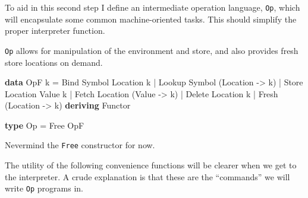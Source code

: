 \documentclass[]{article}
\newenvironment{Shaded}{}{}
\newcommand{\KeywordTok}[1]{\textcolor[rgb]{0.00,0.44,0.13}{\textbf{{#1}}}}
\newcommand{\DataTypeTok}[1]{\textcolor[rgb]{0.56,0.13,0.00}{{#1}}}
\newcommand{\OtherTok}[1]{\textcolor[rgb]{0.00,0.44,0.13}{{#1}}}
\newcommand{\FunctionTok}[1]{\textcolor[rgb]{0.02,0.16,0.49}{{#1}}}
\newcommand{\NormalTok}[1]{{#1}}
\begin{document}
To aid in this second step I define an intermediate operation language,
\texttt{Op}, which will encapsulate some common machine-oriented tasks.
This should simplify the proper interpreter function.

\texttt{Op} allows for manipulation of the environment and store, and
also provides fresh store locations on demand.

\begin{Shaded}
\begin{Highlighting}[]
\KeywordTok{data} \DataTypeTok{OpF} \NormalTok{k}
    \FunctionTok{=} \DataTypeTok{Bind}   \DataTypeTok{Symbol} \DataTypeTok{Location} \NormalTok{k}
    \FunctionTok{|} \DataTypeTok{Lookup} \DataTypeTok{Symbol} \NormalTok{(}\DataTypeTok{Location} \OtherTok{->} \NormalTok{k)}
    \FunctionTok{|} \DataTypeTok{Store}  \DataTypeTok{Location} \DataTypeTok{Value} \NormalTok{k}
    \FunctionTok{|} \DataTypeTok{Fetch}  \DataTypeTok{Location} \NormalTok{(}\DataTypeTok{Value} \OtherTok{->} \NormalTok{k)}
    \FunctionTok{|} \DataTypeTok{Delete} \DataTypeTok{Location} \NormalTok{k}
    \FunctionTok{|} \DataTypeTok{Fresh}  \NormalTok{(}\DataTypeTok{Location} \OtherTok{->} \NormalTok{k)}
    \KeywordTok{deriving} \DataTypeTok{Functor}
\end{Highlighting}
\end{Shaded}

\begin{Shaded}
\begin{Highlighting}[]
\KeywordTok{type} \DataTypeTok{Op} \FunctionTok{=} \DataTypeTok{Free} \DataTypeTok{OpF}
\end{Highlighting}
\end{Shaded}

Nevermind the \texttt{Free} constructor for now.

The utility of the following convenience functions will be clearer when
we get to the interpreter. A crude explanation is that these are the
``commands'' we will write \texttt{Op} programs in.

\begin{Shaded}
\end{Shaded}

\begin{Shaded}
\end{Shaded}
\end{document}
